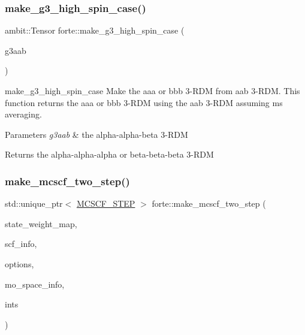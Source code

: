\subsubsection{\texorpdfstring{make\+\_\+g3\+\_\+high\+\_\+spin\+\_\+case()}{make\_g3\_high\_spin\_case()}}
{\footnotesize\ttfamily ambit\+::\+Tensor forte\+::make\+\_\+g3\+\_\+high\+\_\+spin\+\_\+case (\begin{DoxyParamCaption}\item[{const ambit\+::\+Tensor \&}]{g3aab }\end{DoxyParamCaption})}



make\+\_\+g3\+\_\+high\+\_\+spin\+\_\+case Make the aaa or bbb 3-\/\+R\+DM from aab 3-\/\+R\+DM. This function returns the aaa or bbb 3-\/\+R\+DM using the aab 3-\/\+R\+DM assuming ms averaging. 


\begin{DoxyParams}{Parameters}
{\em g3aab} & the alpha-\/alpha-\/beta 3-\/\+R\+DM \\
\hline
\end{DoxyParams}
\begin{DoxyReturn}{Returns}
the alpha-\/alpha-\/alpha or beta-\/beta-\/beta 3-\/\+R\+DM 
\end{DoxyReturn}
\mbox{\label{namespaceforte_afe2e464351f0b9e7657744e5c9292592}} 
\subsubsection{\texorpdfstring{make\+\_\+mcscf\+\_\+two\+\_\+step()}{make\_mcscf\_two\_step()}}
{\footnotesize\ttfamily std\+::unique\+\_\+ptr$<$ \mbox{\hyperlink{classforte_1_1_m_c_s_c_f__2_s_t_e_p}{M\+C\+S\+C\+F\+\_\+S\+T\+EP}} $>$ forte\+::make\+\_\+mcscf\+\_\+two\+\_\+step (\begin{DoxyParamCaption}\item[{const std\+::map$<$ \mbox{\hyperlink{classforte_1_1_state_info}{State\+Info}}, std\+::vector$<$ double $>$$>$ \&}]{state\+\_\+weight\+\_\+map,  }\item[{std\+::shared\+\_\+ptr$<$ \mbox{\hyperlink{classforte_1_1_s_c_f_info}{S\+C\+F\+Info}} $>$}]{scf\+\_\+info,  }\item[{std\+::shared\+\_\+ptr$<$ \mbox{\hyperlink{classforte_1_1_forte_options}{Forte\+Options}} $>$}]{options,  }\item[{std\+::shared\+\_\+ptr$<$ \mbox{\hyperlink{classforte_1_1_m_o_space_info}{M\+O\+Space\+Info}} $>$}]{mo\+\_\+space\+\_\+info,  }\item[{std\+::shared\+\_\+ptr$<$ \mbox{\hyperlink{classforte_1_1_forte_integrals}{Forte\+Integrals}} $>$}]{ints }\end{DoxyParamCaption})}

